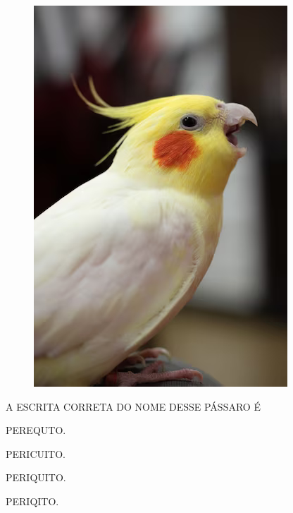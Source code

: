 \begin{figure}[H]
\centering
\includegraphics[width=\textwidth]{./media/image231.png}
\end{figure}

A ESCRITA CORRETA DO NOME DESSE PÁSSARO É

\begin{escolha}

\item PEREQUTO.

\item PERICUITO.

\item PERIQUITO.

\item PERIQITO.

\end{escolha}


